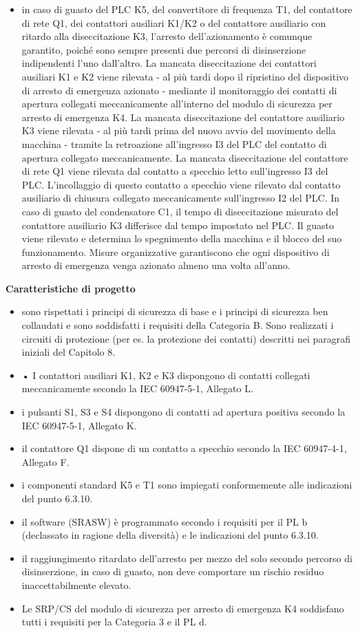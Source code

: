 \begin{itemize}
    \item in caso di guasto del PLC K5, del convertitore di frequenza T1, del contattore di rete Q1, dei contattori ausiliari K1/K2 o del contattore ausiliario con ritardo alla diseccitazione K3, l'arresto dell'azionamento è comunque garantito, poiché sono sempre presenti due percorsi di disinserzione indipendenti l'uno dall'altro. La mancata diseccitazione dei contattori ausiliari K1 e K2 viene rilevata - al più tardi dopo il ripristino del dispositivo di arresto di emergenza azionato - mediante il monitoraggio dei contatti di apertura collegati meccanicamente all'interno del modulo di sicurezza per arresto di emergenza K4. La mancata diseccitazione del contattore ausiliario K3 viene rilevata - al più tardi prima del nuovo avvio del movimento della macchina - tramite la retroazione all'ingresso I3 del PLC del contatto di apertura collegato meccanicamente. La mancata diseccitazione del contattore di rete Q1 viene rilevata dal contatto a specchio letto sull'ingresso I3 del PLC. L'incollaggio di questo contatto a specchio viene rilevato dal contatto ausiliario di chiusura collegato meccanicamente sull'ingresso I2 del PLC. In caso di guasto del condensatore C1, il tempo di diseccitazione misurato del contattore ausiliario K3 differisce dal tempo impostato nel PLC. Il guasto viene rilevato e determina lo spegnimento della macchina e il blocco del suo funzionamento. Misure organizzative garantiscono che ogni dispositivo di arresto di emergenza venga azionato almeno una volta all'anno.
\end{itemize}

\textbf{Caratteristiche di progetto}
\begin{itemize}
    \item sono rispettati i principi di sicurezza di base e i principi di sicurezza ben collaudati e sono soddisfatti i requisiti della Categoria B. Sono realizzati i circuiti di protezione (per es. la protezione dei contatti) descritti nei paragrafi iniziali del Capitolo 8.
    \item •	I contattori ausiliari K1, K2 e K3 dispongono di contatti collegati meccanicamente secondo la IEC 60947-5-1, Allegato L.
    \item i pulsanti S1, S3 e S4 dispongono di contatti ad apertura positiva secondo la IEC 60947-5-1, Allegato K.
    \item il contattore Q1 dispone di un contatto a specchio secondo la IEC 60947-4-1, Allegato F.
    \item i componenti standard K5 e T1 sono impiegati conformemente alle indicazioni del punto 6.3.10.
    \item il software (SRASW) è programmato secondo i requisiti per il PL b (declassato in ragione della diversità) e le indicazioni del punto 6.3.10.
    \item il raggiungimento ritardato dell'arresto per mezzo del solo secondo percorso di disinserzione, in caso di guasto, non deve comportare un rischio residuo inaccettabilmente elevato.
    \item Le SRP/CS del modulo di sicurezza per arresto di emergenza K4 soddisfano tutti i requisiti per la Categoria 3 e il PL d.
\end{itemize}

